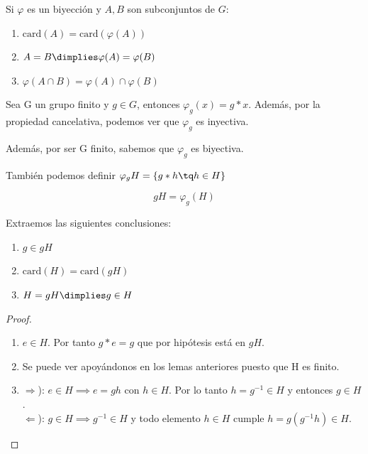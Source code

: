 \documentclass[nochap]{apuntes}
\begin{document}
  \begin{lemma}
   Si $\varphi$  es un biyección y $A, B$ son subconjuntos de $G$:
   \begin{enumerate}
    \item $\text{card}(A)=\text{card}(\varphi(A))$
    \item $A=B \dimplies \varphi(A)=\varphi(B)$
    \item $\varphi(A\cap B)=\varphi(A)\cap\varphi(B)$
   \end{enumerate}
  \end{lemma}
  
  \begin{lemma}
   Sea G un grupo finito y $g \in G$, entonces $\varphi_{g}(x)=g\ast x$. Además, por la propiedad cancelativa, podemos ver que $\varphi_{g}$ es inyectiva.
   
   Además, por ser G finito, sabemos que $\varphi_{g}$ es biyectiva.
  \end{lemma}
  También podemos definir $\varphi_{g} H=\{g\ast h\tq h\in H\}$
  
  \begin{defn}
  \[  gH=\varphi_{g}(H) \]
  \end{defn}

  \begin{corol} 
  \label{corol1}
  Extraemos las siguientes conclusiones:
   \begin{enumerate}
    \item $g \in gH$
    \item $\text{card}(H)=\text{card}(gH)$
    \item $H=gH \dimplies g \in H$ 
   \end{enumerate}
  \end{corol}

  \begin{proof}
   \begin{enumerate}
    \item $e \in  H$. Por tanto $g\ast e =g$ que por hipótesis está en $gH$.
    \item Se puede ver apoyándonos en los lemas anteriores puesto que H es finito.
    \item $\Rightarrow$):  $e \in H \implies e=gh$ con $h \in H$. Por lo tanto $h=g^{-1} \in H$ y entonces $g \in H$.\\
	  $\Leftarrow$):  $g \in H \implies g^{-1}\in H$ y todo elemento $h \in H$ cumple $h=g(g^{-1}h)\in H$.
   \end{enumerate}
  \end{proof}
  
\end{document}
